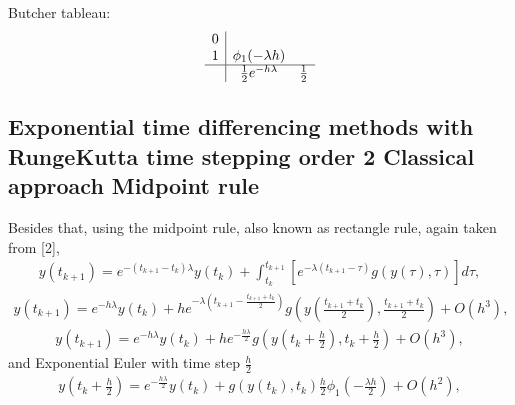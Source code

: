 \documentclass[letterpaper,10pt,english]{jupyterBook}
\begin{document}
\sphinxAtStartPar
Butcher tableau:
\begin{equation*}
\begin{split}
\begin{array}
{c|cc}
0\\
1 & \phi_1(-\lambda h)\\
\hline
& \frac{1}{2} e^{-h \lambda} & \frac{1}{2}
\end{array}
\end{split}
\end{equation*}

\subsection{Exponential time differencing methods with Runge\sphinxhyphen{}Kutta time stepping \sphinxhyphen{} order 2 \sphinxhyphen{} Classical approach \sphinxhyphen{} Midpoint rule}
\label{\detokenize{appendix:exponential-time-differencing-methods-with-runge-kutta-time-stepping-order-2-classical-approach-midpoint-rule}}
\sphinxAtStartPar
Besides that, using the midpoint rule, also known as rectangle rule, again taken from {[}2{]},
\begin{equation*}
\begin{split}
y(t_{k+1}) = e^{-(t_{k+1}-t_k) \lambda}y(t_k) + \int_{t_k}^{t_{k+1}} [e^{-\lambda(t_{k+1}-\tau)} g(y(\tau), \tau)] d\tau,
\end{split}
\end{equation*}\begin{equation*}
\begin{split}
y(t_{k+1}) = e^{-h\lambda}y(t_k) + h e^{-\lambda\left(t_{k+1}-\frac{t_{k+1}+t_k}{2}\right)} g\left(y\left(\frac{t_{k+1}+t_k}{2}\right), \frac{t_{k+1}+t_k}{2}\right) + O(h^3),
\end{split}
\end{equation*}\begin{equation*}
\begin{split}
y(t_{k+1}) = e^{-h\lambda}y(t_k) + h e^{- \frac{h\lambda}{2}} g\left(y\left(t_k + \frac{h}{2}\right), t_k+\frac{h}{2}\right) + O(h^3),
\end{split}
\end{equation*}
\sphinxAtStartPar
and Exponential Euler with time step \(\frac{h}{2}\)
\begin{equation*}
\begin{split}
y\left(t_k + \frac{h}{2}\right) = e^{-\frac{h \lambda}{2}}y(t_k) + g(y(t_k), t_k) \frac{h}{2} \phi_1\left( -\frac{\lambda h}{2} \right) + O(h^2),
\end{split}
\end{equation*}
\end{document}

